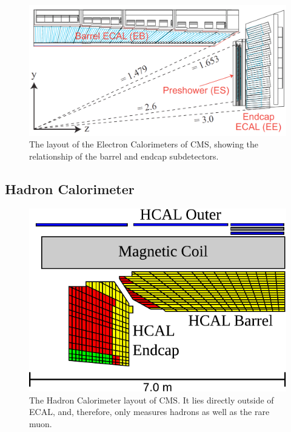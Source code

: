 \begin{figure}[!htbp]
    \includegraphics[width=\textwidth]{figures/ecal_layout.png}
    \caption[
      ECAL layout 
    ]{The layout of the Electron Calorimeters of CMS, showing the relationship of the barrel and endcap subdetectors. 
}
    \label{fig:ecalLayout}
    
\end{figure}


\subsection{Hadron Calorimeter}
\begin{figure}[!htbp]
    \includegraphics[width=\textwidth]{figures/hcal_cross_section.pdf}
    \caption[
      HCAL layout
    ]{
    The Hadron Calorimeter layout of CMS. It lies directly outside of ECAL, and, therefore, only measures hadrons as well as the rare muon.
    }
    \label{fig:hcalLayout}
    
\end{figure}

